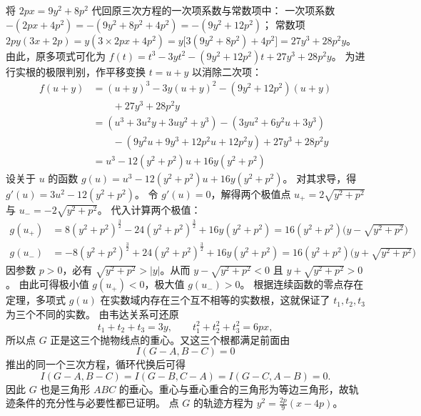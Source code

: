 \begin{solution}
将 $2px = 9y^2 + 8p^2$ 代回原三次方程的一次项系数与常数项中：
一次项系数 $-(2px + 4p^2) = -(9y^2 + 8p^2 + 4p^2) = -(9y^2 + 12p^2)$；
常数项 $2py(3x + 2p) = y(3 \times 2px + 4p^2) = y \big[ 3(9y^2 + 8p^2) + 4p^2 \big] = 27y^3 + 28p^2y$。
由此，原多项式可化为 $f(t) = t^3 - 3y t^2 - (9y^2 + 12p^2)t + 27y^3 + 28p^2y$。
为进行实根的极限判别，作平移变换 $t = u + y$ 以消除二次项：
\begin{align*}
f(u + y)
&= (u+y)^3 - 3y(u+y)^2 - (9y^2 + 12p^2)(u+y) \\
&\qquad + 27y^3 + 28p^2y \\
&= (u^3 + 3u^2 y + 3u y^2 + y^3) - (3y u^2 + 6y^2 u + 3y^3) \\
&\qquad - (9y^2 u + 9y^3 + 12p^2 u + 12p^2 y) + 27y^3 + 28p^2 y \\
&= u^3 - 12(y^2 + p^2)u + 16y(y^2 + p^2)
\end{align*}
设关于 $u$ 的函数 $g(u) = u^3 - 12(y^2 + p^2)u + 16y(y^2 + p^2)$。
对其求导，得 $g'(u) = 3u^2 - 12(y^2 + p^2)$。
令 $g'(u) = 0$，解得两个极值点 $u_+ = 2\sqrt{y^2 + p^2}$ 与 $u_- = -2\sqrt{y^2 + p^2}$。
代入计算两个极值：
\begin{align*}
g(u_+) &= 8(y^2 + p^2)^{\frac{3}{2}} - 24(y^2 + p^2)^{\frac{3}{2}} + 16y(y^2 + p^2) = 16(y^2 + p^2)\big(y - \sqrt{y^2 + p^2}\big) \\
g(u_-) &= -8(y^2 + p^2)^{\frac{3}{2}} + 24(y^2 + p^2)^{\frac{3}{2}} + 16y(y^2 + p^2) = 16(y^2 + p^2)\big(y + \sqrt{y^2 + p^2}\big)
\end{align*}
因参数 $p > 0$，必有 $\sqrt{y^2 + p^2} > |y|$。从而 $y - \sqrt{y^2 + p^2} < 0$ 且 $y + \sqrt{y^2 + p^2} > 0$。
由此可得极小值 $g(u_+) < 0$，极大值 $g(u_-) > 0$。
根据连续函数的零点存在定理，多项式 $g(u)$ 在实数域内存在三个互不相等的实数根，这就保证了 $t_1, t_2, t_3$ 为三个不同的实数。
由韦达关系可还原
\[
t_1+t_2+t_3=3y,\qquad t_1^2+t_2^2+t_3^2=6px,
\]
所以点 $G$ 正是这三个抛物线点的重心。又这三个根都满足前面由
\[
I(G-A,B-C)=0
\]
推出的同一个三次方程，循环代换后可得
\[
I(G-A,B-C)=I(G-B,C-A)=I(G-C,A-B)=0.
\]
因此 $G$ 也是三角形 $ABC$ 的垂心。重心与垂心重合的三角形为等边三角形，故轨迹条件的充分性与必要性都已证明。
点 $G$ 的轨迹方程为 $y^2 = \frac{2p}{9}(x - 4p)$。
\end{solution}





